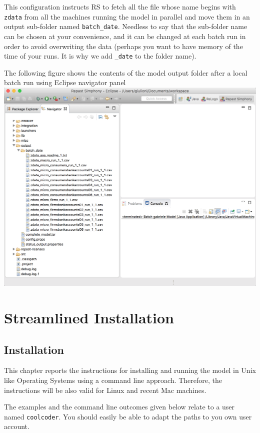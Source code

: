 \documentclass{book}
\begin{document}
This configuration instructs RS to fetch
all the file whose name begins with \verb+zdata+  
from all the machines running the model in parallel 
and move them in an output sub-folder named 
\verb+batch_date+. Needless to say that the sub-folder name can be chosen at your convenience, and it can be changed at each batch run in order to avoid overwriting the data (perhaps you want to have memory of the time of your runs. It is why we add \verb+_date+ to the folder name).


The following figure shows the contents of the model output folder after a local batch run using Eclipse navigator panel\\ 
\noindent
\includegraphics[scale=0.35]{fig_gabriele_rs_batch1}


\chapter{Streamlined Installation}

\section{Installation}
This chapter reports the instructions for installing and running the model in Unix like Operating Systems using a command line approach. Therefore, the instructions will be also valid for Linux and recent Mac machines.

The examples and the command line outcomes given below relate to a user named \verb+coolcoder+. You should easily be able to adapt the paths to you own user account. 
\end{document}
